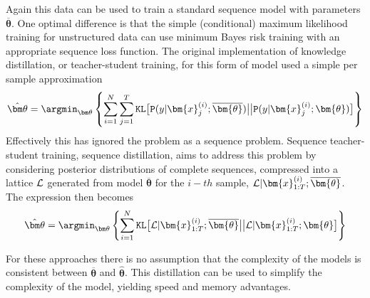 Again this data can be used to train a standard sequence model with parameters ${\overline{\bm\theta}}$. One optimal difference is that the simple (conditional) maximum likelihood training for unstructured data can use minimum Bayes risk training with an appropriate sequence loss function.  The original implementation of knowledge distillation, or teacher-student training, for this form of model used a simple per sample approximation
\begin{eqnarray}
{\hat{\bm\theta}} = \argmin_{\bm\theta}\left\{
\sum_{i=1}^N\sum_{j=1}^T{\tt KL}\big[
{\tt P}(y|\bm{x}^{(i)}_j; {\overline{\bm{\theta}}})
\big|\big|
{{\tt P}(y|\bm{x}^{(i)}_j; {{\bm{\theta}}})}
\big]
\right\}
\end{eqnarray}
Effectively this has ignored the problem as a sequence problem. Sequence teacher-student training, sequence distillation, aims to address this problem by considering posterior distributions of complete sequences, compressed into a lattice ${\cal L}$ generated from model ${\overline{\bm\theta}}$ for the $i-th$ sample, ${\cal L}|\bm{x}^{(i)}_{1:T}; {\overline{\bm{\theta}}}$. The expression then becomes
\begin{eqnarray}
{\hat{\bm\theta}} = \argmin_{\bm\theta}\left\{
\sum_{i=1}^N{\tt KL}\big[
{\cal L}|\bm{x}^{(i)}_{1:T}; {\overline{\bm{\theta}}}
\big|\big|
{\cal L}|\bm{x}^{(i)}_{1:T}; {\bm{\theta}}
\big]
\right\}
\end{eqnarray}

For these approaches there is no assumption that the complexity of the models is consistent between ${\overline{\bm\theta}}$ and ${\hat{\bm\theta}}$. This distillation can be used to simplify the complexity of the model, yielding speed and memory advantages.

